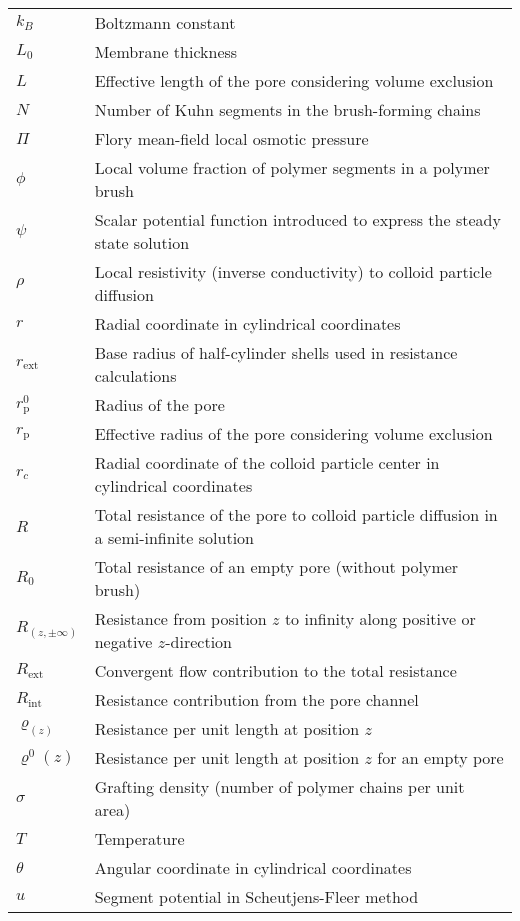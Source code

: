 \documentclass[10pt, a4paper, twocolumn]{article}
\begin{document}
\begin{tabularx}{\linewidth}{l X}
    $k_B$ & Boltzmann constant \\
    $L_{0}$ & Membrane thickness \\
    $L$ & Effective length of the pore considering volume exclusion \\
    $N$ & Number of Kuhn segments in the brush-forming chains \\
    $\Pi$ & Flory mean-field local osmotic pressure \\
    $\phi$ & Local volume fraction of polymer segments in a polymer brush \\
    $\psi$ & Scalar potential function introduced to express the steady state solution \\
    $\rho$ & Local resistivity (inverse conductivity) to colloid particle diffusion \\
    $r$ & Radial coordinate in cylindrical coordinates \\
    $r_{\text{ext}}$ & Base radius of half-cylinder shells used in resistance calculations\\
    $r_{\text{p}}^{0}$ & Radius of the pore \\
    $r_{\text{p}}$ & Effective radius of the pore considering volume exclusion \\
    $r_{c}$ & Radial coordinate of the colloid particle center in cylindrical coordinates \\
    $R$ & Total resistance of the pore to colloid particle diffusion in a semi-infinite solution \\
    $R_{0}$ & Total resistance of an empty pore (without polymer brush) \\
    $R_{(z, \pm\infty)}$ & Resistance from position $z$ to infinity along positive or negative $z$-direction \\
    $R_{\text{ext}}$ & Convergent flow contribution to the total resistance \\
    $R_{\text{int}}$ & Resistance contribution from the pore channel \\
    $\varrho_(z)$ & Resistance per unit length at position $z$ \\
    $\varrho^{0}(z)$ & Resistance per unit length at position $z$ for an empty pore \\
    $\sigma$ & Grafting density (number of polymer chains per unit area) \\
    $T$ & Temperature \\
    $\theta$ & Angular coordinate in cylindrical coordinates \\
    $u$ & Segment potential in Scheutjens-Fleer method\\

\end{tabularx}
\end{document}
